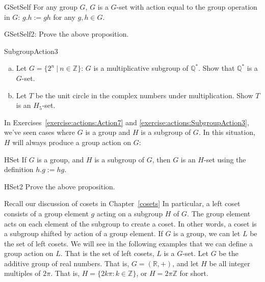 \begin{prop}{GSetSelf} 
For any group $G$, $G$ is a $G$-set with action equal to the group operation in $G$: $g.h:=gh$ for any $g,h \in G$.
\end{prop}

\begin{exercise}{GSetSelf2}: 
Prove the above proposition.
\end {exercise}

\begin{exercise}{SubgroupAction3}
\begin{enumerate} [(a)]
\item Let $G=\{2^n~|~n \in \mathbb{Z}\}$: $G$ is a multiplicative subgroup of $\mathbb{Q}^*$. Show that $\mathbb{Q}^*$ is a $G$-set.
\item Let $T$ be the unit circle in the complex numbers under multiplication.  Show $T$ is an $H_5$-set.
\end{enumerate}
\end {exercise}

In Exercises~\ref{exercise:actions:Action7} and \ref{exercise:actions:SubgroupAction3}, we've seen cases where $G$ is a group and $H$ is a subgroup of $G$.  In this situation, $H$ will always produce a group action on $G$:

\begin{prop}{HSet} 
If $G$ is a group, and $H$ is a subgroup of $G$, then $G$ is an $H$-set using the definition $h.g:=hg$.
\end{prop}

\begin{exercise}{HSet2} 
Prove the above proposition.
\end {exercise}

Recall our discussion of cosets in Chapter~\ref{cosets} In particular, a left coset consists of a group element $g$ acting on a subgroup $H$ of $G$. The group element acts on each element of the subgroup to create a coset. In other words, a coset is a subgroup shifted by action of a group element.  If $G$ is a group, we can let $L$ be the set of left cosets. We will see in the following examples that we can define a group action on $L$.  That is the set of left cosets, $L$ is a $G$-set.
Let $G$ be the additive group of real numbers.  That is, $G=(\mathbb{R},+)$, and let $H$ be all integer multiples of $2\pi$.   That is, $H=\{2k\pi:k\in \mathbb{Z}\}$, or $H = 2 \pi \mathbb{Z}$ for short.  

